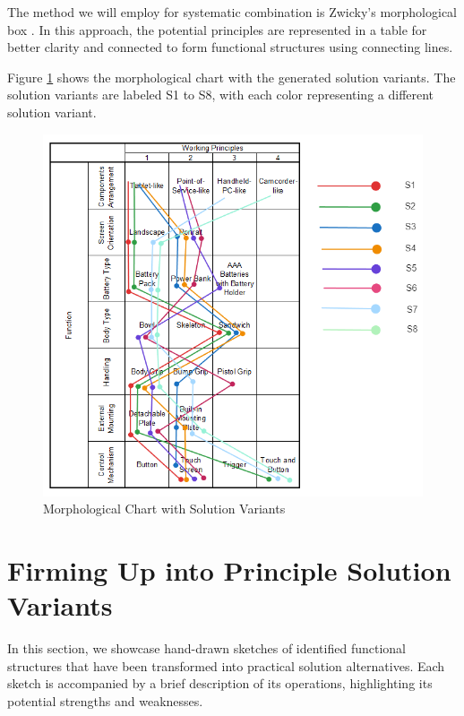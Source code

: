 The method we will employ for systematic combination is Zwicky's morphological box \cite{Kushahrin22}. In this approach, the potential principles are represented in a table for better clarity and connected to form functional structures using connecting lines.

Figure \ref{fig:morphological-chart-with-solution-variants} shows the morphological chart with the generated solution variants. The solution variants are labeled S1 to S8, with each color representing a different solution variant.

\begin{figure}[ht!]
    \centering
    \includegraphics[width=\linewidth]{texs/Part1/chapter3/image/combinedchart.png}
    \caption{Morphological Chart with Solution Variants}
    \label{fig:morphological-chart-with-solution-variants}
\end{figure}

\section{Firming Up into Principle Solution Variants}
In this section, we showcase hand-drawn sketches of identified functional structures that have been transformed into practical solution alternatives. Each sketch is accompanied by a brief description of its operations, highlighting its potential strengths and weaknesses.


